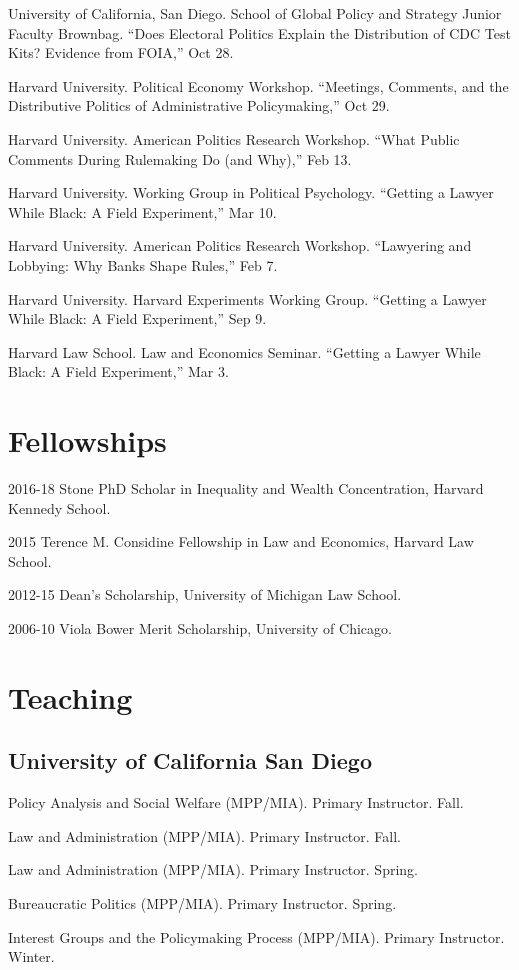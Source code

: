 \documentclass[12pt,letterpaper]{report}
\newcommand{\talk}[4]{\item[#1]{\tab{}#3. \enquote{#2,} #4.}} %
\newcommand{\course}[5]{\item[#1] \tab{}#3 (#4). #5. #2.} %
\begin{document}
    \begin{tablist}
    \talk{2020}{Does Electoral Politics Explain the Distribution of CDC Test Kits? Evidence from FOIA}{ University of California, San Diego. School of Global Policy and Strategy Junior Faculty Brownbag}{Oct 28}
    \talk{2018}{Meetings, Comments, and the Distributive Politics of Administrative Policymaking}{Harvard University. Political Economy Workshop}{Oct 29}
	\talk{2018}{What Public Comments During Rulemaking Do (and Why)}{Harvard University. American Politics Research Workshop}{Feb 13}
    \talk{2017}{Getting a Lawyer While Black: A Field Experiment}{Harvard University. Working Group in Political Psychology}{Mar 10}
    \talk{2017}{Lawyering and Lobbying: Why Banks Shape Rules}{Harvard University. American Politics Research Workshop}{Feb 7}
    \talk{2016}{Getting a Lawyer While Black: A Field Experiment}{Harvard University. Harvard Experiments Working Group}{Sep 9}
    \talk{2016}{Getting a Lawyer While Black: A Field Experiment}{Harvard Law School. Law and Economics Seminar}{Mar 3}
    \end{tablist}
    
    
    \section*{Fellowships}
    
    \begin{tablist}
    \item[2016-18] \tab{}Stone PhD Scholar in Inequality and Wealth Concentration, Harvard Kennedy School.
    \item[2015] \tab{}Terence M. Considine Fellowship in Law and Economics, Harvard Law School.
    \item[2012-15] \tab{}Dean's Scholarship, University of Michigan Law School.
    \item[2006-10] \tab{}Viola Bower Merit Scholarship, University of Chicago.
    \end{tablist}

    \section*{Teaching}
    
    \subsection*{University of California San Diego}
    \begin{tablist}
    \course{2021}{Fall}{Policy Analysis and Social Welfare}{MPP/MIA}{Primary Instructor}
    \course{2021}{Fall}{Law and Administration}{MPP/MIA}{Primary Instructor}
    \course{2021}{Spring}{Law and Administration}{MPP/MIA}{Primary Instructor}
    \course{2021}{Spring}{Bureaucratic Politics}{MPP/MIA}{Primary Instructor}
    \course{2021}{Winter}{Interest Groups and the Policymaking Process}{MPP/MIA}{Primary Instructor}
    \end{tablist}
    
\end{document}
